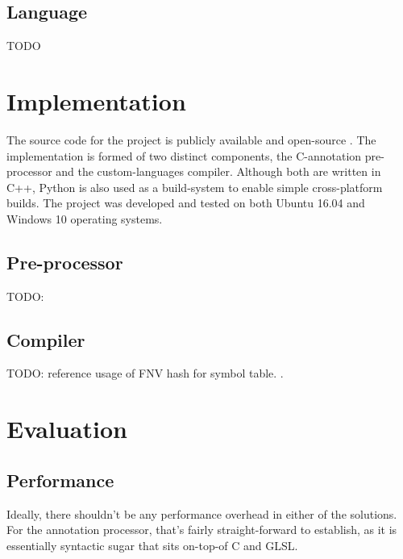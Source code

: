 \documentclass[a4paper,12pt,twoside,openright]{report}
\begin{document}
\section{Language}

TODO

\chapter{Implementation}


The source code for the project is publicly available and open-source
\cite{ProjectSource}. The implementation is formed of two distinct components,
the C-annotation pre-processor and the custom-languages compiler. Although both
are written in C++, Python is also used as a build-system to enable simple
cross-platform builds. The project was developed and tested on both Ubuntu
16.04 and Windows 10 operating systems.


\section{Pre-processor}

TODO:

\section{Compiler}

TODO: reference usage of FNV hash for symbol table. \cite{FNVHash}.


\chapter{Evaluation}



\section{Performance}

Ideally, there shouldn't be any performance overhead in either of the
solutions. For the annotation processor, that's fairly straight-forward to
establish, as it is essentially syntactic sugar that sits on-top-of C and GLSL.
\end{document}
